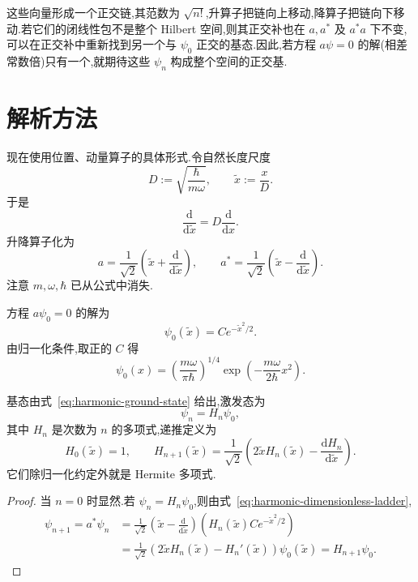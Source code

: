 这些向量形成一个正交链,其范数为 \(\sqrt{n!}\),升算子把链向上移动,降算子把链向下移动.若它们的闭线性包不是整个 Hilbert 空间,则其正交补也在 \(a,a^{*}\) 及 \(a^{*}a\) 下不变,可以在正交补中重新找到另一个与 \(\psi_{0}\) 正交的基态.因此,若方程 \(a\psi=0\) 的解(相差常数倍)只有一个,就期待这些 \(\psi_{n}\) 构成整个空间的正交基.

\section{解析方法}
\label{sec:harmonic-analytic}

现在使用位置、动量算子的具体形式.令自然长度尺度
\[
D:=\sqrt{\frac{\hbar}{m\omega}},
\qquad
\widetilde x:=\frac{x}{D}.
\]
于是
\[
\frac{\mathrm{d}}{\mathrm{d}\widetilde x}=D\frac{\mathrm{d}}{\mathrm{d}x}.
\]
升降算子化为
\[
a=\frac{1}{\sqrt2}\left(\widetilde x+\frac{\mathrm{d}}{\mathrm{d}\widetilde x}\right),
\qquad
a^{*}=\frac{1}{\sqrt2}\left(\widetilde x-\frac{\mathrm{d}}{\mathrm{d}\widetilde x}\right).
\label{eq:harmonic-dimensionless-ladder}
\]
注意 \(m,\omega,\hbar\) 已从公式中消失.

方程 \(a\psi_{0}=0\) 的解为
\[
\psi_{0}(\widetilde x)=Ce^{-\widetilde x^{2}/2}.
\]
由归一化条件,取正的 \(C\) 得
\[
\psi_{0}(x)=\left(\frac{m\omega}{\pi\hbar}\right)^{1/4}
\exp\left(-\frac{m\omega}{2\hbar}x^{2}\right).
\label{eq:harmonic-ground-state}
\]

\begin{theorem}\label{thm:harmonic-hermite-states}
基态由式~\eqref{eq:harmonic-ground-state} 给出,激发态为
\[
\psi_{n}=H_{n}\psi_{0},
\label{eq:harmonic-excited-states}
\]
其中 \(H_{n}\) 是次数为 \(n\) 的多项式,递推定义为
\[
H_{0}(\widetilde x)=1,
\qquad
H_{n+1}(\widetilde x)=\frac{1}{\sqrt2}\left(2\widetilde xH_{n}(\widetilde x)-\frac{\mathrm{d}H_{n}}{\mathrm{d}\widetilde x}\right).
\]
它们除归一化约定外就是 Hermite 多项式.
\end{theorem}

\begin{proof}
当 \(n=0\) 时显然.若 \(\psi_{n}=H_{n}\psi_{0}\),则由式~\eqref{eq:harmonic-dimensionless-ladder},
\[
\begin{aligned}
\psi_{n+1}=a^{*}\psi_{n}
&=\frac{1}{\sqrt2}\left(\widetilde x-\frac{\mathrm{d}}{\mathrm{d}\widetilde x}\right)
\left(H_{n}(\widetilde x)Ce^{-\widetilde x^{2}/2}\right)\\
&=\frac{1}{\sqrt2}\left(2\widetilde xH_{n}(\widetilde x)-H_{n}'(\widetilde x)\right)\psi_{0}(\widetilde x)
=H_{n+1}\psi_{0}.
\end{aligned}
\]
\end{proof}

